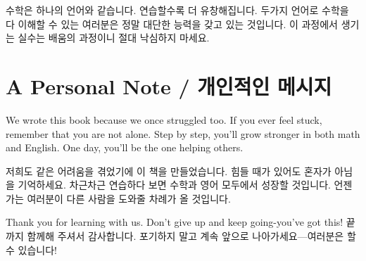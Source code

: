 \documentclass[10pt]{article}
\begin{document}
수학은 하나의 언어와 같습니다. 연습할수록 더 유창해집니다. 두가지 언어로 수학을 다 이해할 수 있는 여러분은 정말 대단한 능력을 갖고 있는 것입니다. 이 과정에서 생기는 실수는 배움의 과정이니 절대 낙심하지 마세요.

\section*{A Personal Note / 개인적인 메시지}
We wrote this book because we once struggled too. If you ever feel stuck, remember that you are not alone. Step by step, you'll grow stronger in both math and English. One day, you'll be the one helping others.

저희도 같은 어려움을 겪었기에 이 책을 만들었습니다. 힘들 때가 있어도 혼자가 아님을 기억하세요. 차근차근 연습하다 보면 수학과 영어 모두에서 성장할 것입니다. 언젠가는 여러분이 다른 사람을 도와줄 차례가 올 것입니다.

Thank you for learning with us. Don't give up and keep going-you've got this! 끝까지 함께해 주셔서 감사합니다. 포기하지 말고 계속 앞으로 나아가세요—여러분은 할 수 있습니다!
\end{document}
